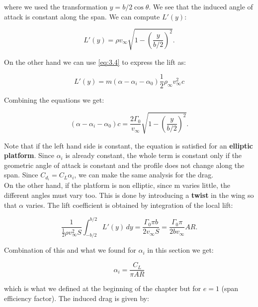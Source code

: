 	where we used the transformation $y = b/2 \cos \theta$. We see that the induced angle of attack is constant along the span. We can compute $L'(y)$: 
	
	\begin{equation}
	L'(y) = \rho v_\infty \sqrt{1-\left( \frac{y}{b/2} \right)^2}.
	\end{equation}
	
	On the other hand we can use \eqref{eq:3.4} to express the lift as: 
	
	\begin{equation}
	L'(y) = m (\alpha - \alpha _i - \alpha _0) \frac{1}{2} \rho _\infty v_\infty ^2 c
	\end{equation}
	
	Combining the equations we get: 
	
	\begin{equation}
	(\alpha - \alpha _i - \alpha _0) c = \frac{2\Gamma _0}{v_\infty} \sqrt{1-\left( \frac{y}{b/2}\right)^2}. 
	\end{equation}
	
	Note that if the left hand side is constant, the equation is satisfied for an \textbf{elliptic platform}. Since $\alpha _i$ is already constant, the whole term is constant only if the geometric angle of attack is constant and the profile does not change along the span. Since $C_{d_i} = C_L \alpha _i$, we can make the same analysis for the drag. \\
	
	On the other hand, if the platform is non elliptic, since m varies little, the different angles must vary too. This is done by introducing a \textbf{twist} in the wing so that $\alpha$ varies. The lift coefficient is obtained by integration of the local lift:
	
	\begin{equation}
	\frac{1}{\frac{1}{2}\rho v_\infty ^2 S} \int _{-b/2}^{b/2} L'(y) \, dy = \frac{\Gamma _0\pi b}{2v_\infty S} = \frac{\Gamma _0 \pi}{2bv_\infty} AR.
	\end{equation}
	 
	 Combination of this and what we found for $\alpha _i$ in this section we get:
	 
	 \begin{equation}
	 \alpha _i = \frac{C_L}{\pi AR}
	 \end{equation}
	 
	 which is what we defined at the beginning of the chapter but for $e =1$ (span efficiency factor). The induced drag is given by:
	 
